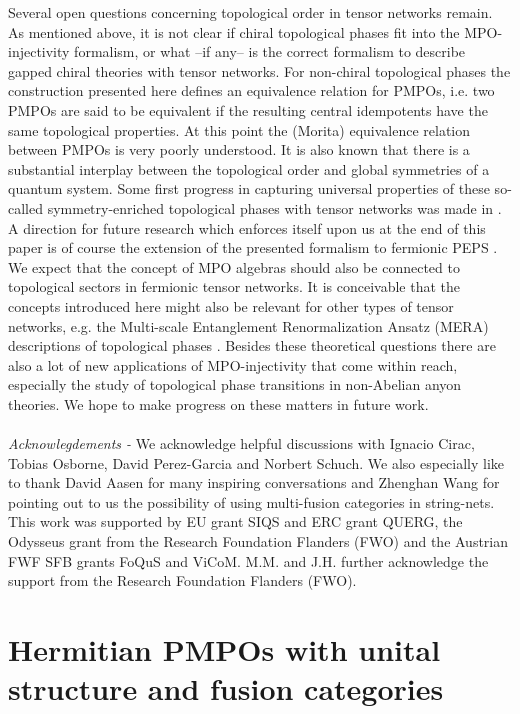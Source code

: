 \documentclass[12 pt]{article}
\begin{document}
Several open questions concerning topological order in tensor networks remain. As mentioned above, it is not clear if chiral topological phases fit into the MPO-injectivity formalism, or what --if any-- is the correct formalism to describe gapped chiral theories with tensor networks. For non-chiral topological phases the construction presented here defines an equivalence relation for PMPOs, i.e. two PMPOs are said to be equivalent if the resulting central idempotents have the same topological properties. At this point the (Morita) equivalence relation between PMPOs is very poorly understood. It is also known that there is a substantial interplay between the topological order and global symmetries of a quantum system. Some first progress in  capturing universal properties of these so-called symmetry-enriched topological phases with tensor networks was made in \cite{JiangRan}. A direction for future research which enforces itself upon us at the end of this paper is of course the extension of the presented formalism to fermionic PEPS \cite{fPEPS}. We expect that the concept of MPO algebras should also be connected to topological sectors in fermionic tensor networks. It is conceivable that the concepts introduced here might also be relevant for other types of tensor networks, e.g. the Multi-scale Entanglement Renormalization Ansatz (MERA) descriptions of topological phases \cite{MERA1,MERA2}. Besides these theoretical questions there are also a lot of new applications of MPO-injectivity that come within reach, especially the study of topological phase transitions in non-Abelian anyon theories. We hope to make progress on these matters in future work.
\\ \\
\emph{Acknowlegdements -} We acknowledge helpful discussions with Ignacio Cirac, Tobias Osborne, David Perez-Garcia and Norbert Schuch. We also especially like to thank David Aasen for many inspiring conversations and Zhenghan Wang for pointing out to us the possibility of using multi-fusion categories in string-nets. This work was supported by EU grant SIQS and ERC grant QUERG, the Odysseus grant from the Research Foundation Flanders (FWO) and the Austrian FWF SFB grants FoQuS and ViCoM. M.M. and J.H. further acknowledge the support from the Research Foundation Flanders (FWO).



\appendix

\section{Hermitian PMPOs with unital structure and fusion categories}\label{app:equivalence}
\end{document}
